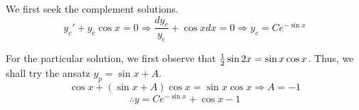 \item

We first seek the complement solutions.
\[
	y_{c}' + y_c \cos x = 0
	\Rightarrow \frac{dy_c}{y_c} + \cos x dx = 0
	\Rightarrow y_{c} = Ce^{-\sin x}
\]

For the particular solution, we first observe that $\frac{1}{2} \sin 2x = \sin x \cos x$.
Thus, we shall try the ansatz $y_p = \sin x + A$.
\[
	\cos x + (\sin x + A) \cos x = \sin x \cos x
	\Rightarrow A = -1
\]
\[
	\therefore y = Ce^{-\sin x} + \cos x - 1
\]
